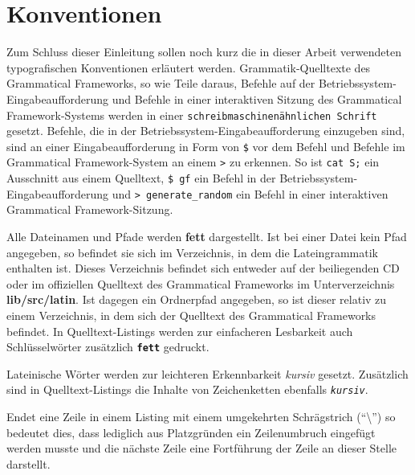 \section{Konventionen}
Zum Schluss dieser Einleitung sollen noch kurz die in dieser Arbeit verwendeten typografischen Konventionen erläutert werden. Grammatik-Quelltexte des Grammatical Frameworks, so wie Teile daraus, Befehle auf der Be\-triebs\-sys\-tem-Ein\-ga\-be\-auf\-for\-de\-rung und Befehle in einer interaktiven Sitzung des Grammatical Framework-Systems werden in einer \texttt{schreibmaschinenähnlichen Schrift} gesetzt. Befehle, die in der Be\-triebs\-sys\-tem-Ein\-ga\-be\-auf\-for\-de\-rung einzugeben sind, sind an einer Ein\-ga\-be\-auf\-for\-de\-rung in Form von \texttt{\$} vor dem Befehl und Befehle im Grammatical Framework-System an einem \texttt{>} zu erkennen. So ist \texttt{cat S;} ein Ausschnitt aus einem Quelltext, \mbox{\texttt{\$ gf}} ein Befehl in der Betriebssystem-Ein\-ga\-be\-auf\-for\-de\-rung und \mbox{\texttt{> generate\_random}} ein Befehl in einer interaktiven Grammatical Framework-Sitzung. \par
Alle Dateinamen und Pfade werden \textbf{fett} dargestellt. Ist bei einer Datei kein Pfad angegeben, so befindet sie sich im Verzeichnis, in dem die Lateingrammatik enthalten ist. Dieses Verzeichnis befindet sich entweder auf der beiliegenden CD oder im offiziellen Quelltext des Grammatical Frameworks im Unterverzeichnis \textbf{lib/src/latin}. Ist dagegen ein Ordnerpfad angegeben, so ist dieser relativ zu einem Verzeichnis, in dem sich der Quelltext des Grammatical Frameworks befindet. In Quelltext-Listings werden zur einfacheren Lesbarkeit auch Schlüsselwörter zusätzlich \texttt{\textbf{fett}} gedruckt.\par
Lateinische Wörter werden zur leichteren Erkennbarkeit \textit{kursiv} gesetzt. Zusätzlich sind in Quelltext-Listings die Inhalte von Zeichenketten ebenfalls \texttt{\textit{kursiv}}. \par
Endet eine Zeile in einem Listing mit einem umgekehrten Schrägstrich ("`\textbackslash"') so bedeutet dies, dass lediglich aus Platzgründen ein Zeilenumbruch eingefügt werden musste und die nächste Zeile eine Fortführung der Zeile an dieser Stelle darstellt.